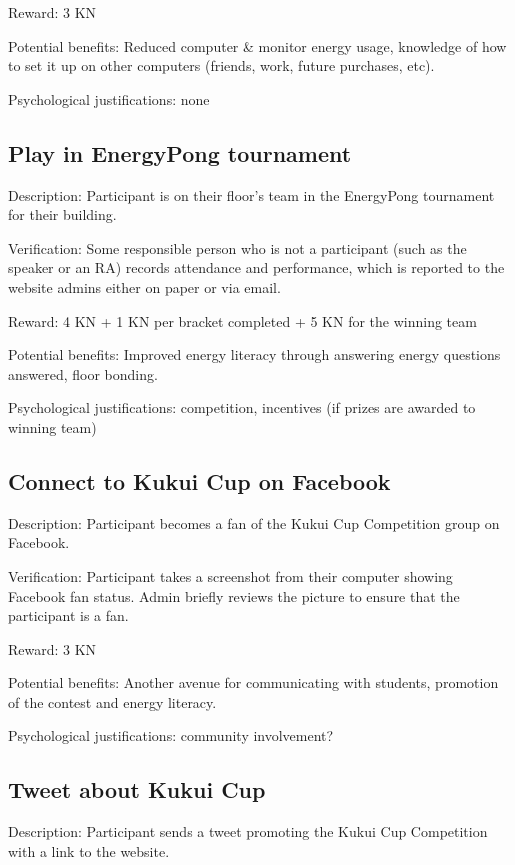 Reward: 3 KN

Potential benefits: Reduced computer \& monitor energy usage, knowledge of how to set it up on other computers (friends, work, future purchases, etc).

Psychological justifications: none

\subsection{Play in EnergyPong tournament}

Description: Participant is on their floor's team in the EnergyPong tournament for their building.

Verification: Some responsible person who is not a participant (such as the speaker or an RA) records attendance and performance, which is reported to the website admins either on paper or via email.

Reward: 4 KN + 1 KN per bracket completed + 5 KN for the winning team

Potential benefits: Improved energy literacy through answering energy questions answered, floor bonding.

Psychological justifications: competition, incentives (if prizes are awarded to winning team)

\subsection{Connect to Kukui Cup on Facebook}

Description: Participant becomes a fan of the Kukui Cup Competition group on Facebook.

Verification: Participant takes a screenshot from their computer showing Facebook fan status. Admin briefly reviews the picture to ensure that the participant is a fan.

Reward: 3 KN

Potential benefits: Another avenue for communicating with students, promotion of the contest and energy literacy.

Psychological justifications: community involvement?

\subsection{Tweet about Kukui Cup}

Description: Participant sends a tweet promoting the Kukui Cup Competition with a link to the website.

